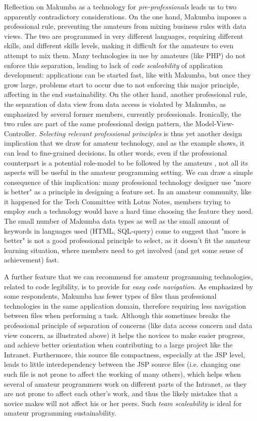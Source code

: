 \documentclass{sig-alt-release2}
\begin{document}
Reflection on Makumba as a technology for \textit{pre-professionals} \cite{stebbins79} leads us to two apparently contradictory considerations. On the one hand, Makumba imposes a professional rule, preventing the amateurs from mixing business rules with data views.  The two are programmed in very different languages, requiring different skills, and different skills levels, making  it difficult for the amateurs to even attempt to mix them. Many technologies in use by amateurs (like PHP) do not enforce this separation, leading to lack of \textit{code scaleability} of application development: applications can be started fast, like with Makumba, but once they grow large, problems start to occur due to not enforcing this major principle, affecting in the end sustainability. On the other hand, another professional rule, the separation of data view from data access is violated by Makumba, as emphasized by several former members, currently professionals. Ironically, the two rules are part of the same professional design pattern, the Model-View-Controller. \textit{Selecting relevant professional principles} is thus yet another design implication that we draw for amateur technology, and as the example shows, it can lead to fine-grained decisions. In other words, even if the professional counterpart is a potential role-model to be followed by the amateurs \cite{stebbins79}, not all its aspects will be useful in the amateur programming setting. We can draw a simple consequence of this implication: many professional technology designer use "more is better" as a principle in designing a feature set. In an amateur community, like it happened for the Tech Committee with Lotus Notes, members trying to employ such a technology would have a hard time choosing the feature they need. The small number of Makumba data types as well as the small amount of keywords in languages used (HTML, SQL-query) come to suggest that "more is better" is not a good professional principle to select, as it doesn't fit the amateur learning situation, where members need to get involved (and get some sense of achievement) fast. 

A further feature that we can recommend for amateur programming technologies, related to code legibility, is to provide for \textit{easy code navigation}.  As emphasized by some respondents, Makumba has fewer types of files than professional technologies in the same application domain, therefore requiring less navigation between files when performing a task. Although this sometimes breaks the professional principle of separation of concerns (like data access concern and data view concern, as illustrated above) it helps the novices to make easier progress, and achieve better orientation when contributing to a large project like the Intranet. Furthermore, this source file compactness, especially at the JSP level, leads to little interdependency between the JSP source files (i.e. changing one such file is not prone to affect the working of many others), which helps when several of amateur programmers work on different parts of the Intranet, as they are not prone to affect each other's work, and thus the likely mistakes that a novice makes will not affect his or her peers. Such \textit{team scaleability} is ideal for amateur programming sustainability.
\end{document}
